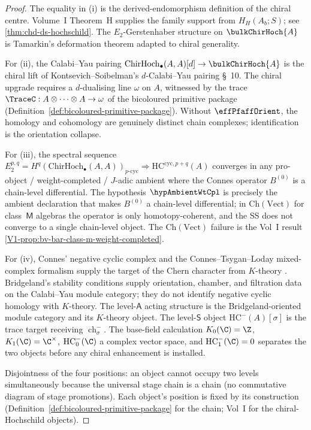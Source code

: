 \begin{proof}
The equality in (i) is the derived-endomorphism definition of the
chiral centre.  Volume~I Theorem~H supplies the family support from
$H_H(A_b;S)$; see \cref{thm:chd-ds-hochschild}. The
$E_2$-Gerstenhaber structure on $\bulkChirHoch{A}$ is Tamarkin's
deformation theorem \cite{Tamarkin2003} adapted to chiral
generality.

For (ii), the Calabi--Yau pairing
$\mathrm{ChirHoch}_{\bullet}(A, A)[d] \to \bulkChirHoch{A}$ is the
chiral lift of Kontsevich--Soibelman's $d$-Calabi--Yau pairing
\cite{KS09} \S~10. The chiral upgrade requires a $d$-dualising line
$\omega$ on $A$, witnessed by the trace
$\TraceC: A \otimes \cdots \otimes A \to \omega$
of the bicoloured primitive package
(Definition~\ref{def:bicoloured-primitive-package}). Without
$\effPfaffOrient$, the homology and cohomology are genuinely
distinct chain complexes; identification is the orientation
collapse.

For (iii), the spectral sequence
$E^{p, q}_2 = H^q(\mathrm{ChirHoch}_{\bullet}(A, A))_{p\text{-cyc}}
 \Rightarrow \mathrm{HC}^{\mathrm{cyc}, p+q}(A)$
converges in any pro-object / weight-completed / $J$-adic
ambient where the Connes operator $B^{(0)}$ is a chain-level
differential. The hypothesis $\hypAmbientWtCpl$ is precisely
the ambient declaration that makes $B^{(0)}$ a chain-level
differential; in $\mathrm{Ch}(\mathrm{Vect})$ for class~$\mathsf{M}$
algebras the operator is only homotopy-coherent, and the SS
does not converge to a single chain-level object. The
$\mathrm{Ch}(\mathrm{Vect})$ failure is the Vol~I result
\cref{V1-prop:bv-bar-class-m-weight-completed}.

For (iv), Connes' negative cyclic complex and the
Connes--Tsygan--Loday mixed-complex formalism supply the target of
the Chern character from $K$-theory
\cite{Con85,LQ84}. Bridgeland's stability conditions
\cite{Bridgeland07,BM01} supply orientation, chamber, and filtration
data on the Calabi--Yau module category; they do not identify
negative cyclic homology with $K$-theory. The level-$\mathsf{A}$
acting structure is the Bridgeland-oriented module category and its
$K$-theory object. The level-$\mathsf{S}$ object
$\mathrm{HC}^{-}(A)[\sigma]$ is the trace target receiving
\(\operatorname{ch}^{-}_{\sigma}\). The base-field calculation
\(K_0(\C)=\Z\), \(K_1(\C)=\C^\times\),
\(\mathrm{HC}^{-}_0(\C)\) a complex vector space, and
\(\mathrm{HC}^{-}_1(\C)=0\) separates the two objects before any
chiral enhancement is installed.

Disjointness of the four positions: an object cannot occupy two
levels simultaneously because the universal stage chain is a
chain (no commutative diagram of stage promotions). Each object's
position is fixed by its construction
(Definition~\ref{def:bicoloured-primitive-package} for the chain;
Vol~I \cite{LQ84,Con85} for the chiral-Hochschild objects).
\end{proof}

